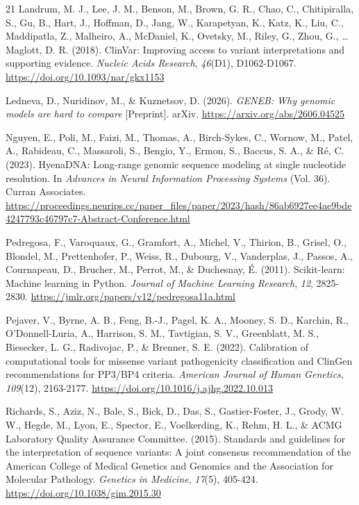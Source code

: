 \begin{thebibliography}{21}
Landrum, M. J., Lee, J. M., Benson, M., Brown, G. R., Chao, C., Chitipiralla, S., Gu, B., Hart, J., Hoffman, D., Jang, W., Karapetyan, K., Katz, K., Liu, C., Maddipatla, Z., Malheiro, A., McDaniel, K., Ovetsky, M., Riley, G., Zhou, G., \ldots{} Maglott, D. R. (2018). ClinVar: Improving access to variant interpretations and supporting evidence. \textit{Nucleic Acids Research}, \textit{46}(D1), D1062-D1067. \url{https://doi.org/10.1093/nar/gkx1153}

Ledneva, D., Nuridinov, M., \& Kuznetsov, D. (2026). \textit{GENEB: Why genomic models are hard to compare} [Preprint]. arXiv. \url{https://arxiv.org/abs/2606.04525}

Nguyen, E., Poli, M., Faizi, M., Thomas, A., Birch-Sykes, C., Wornow, M., Patel, A., Rabideau, C., Massaroli, S., Bengio, Y., Ermon, S., Baccus, S. A., \& R{\'e}, C. (2023). HyenaDNA: Long-range genomic sequence modeling at single nucleotide resolution. In \textit{Advances in Neural Information Processing Systems} (Vol. 36). Curran Associates. \url{https://proceedings.neurips.cc/paper_files/paper/2023/hash/86ab6927ee4ae9bde4247793c46797c7-Abstract-Conference.html}

Pedregosa, F., Varoquaux, G., Gramfort, A., Michel, V., Thirion, B., Grisel, O., Blondel, M., Prettenhofer, P., Weiss, R., Dubourg, V., Vanderplas, J., Passos, A., Cournapeau, D., Brucher, M., Perrot, M., \& Duchesnay, {\'E}. (2011). Scikit-learn: Machine learning in Python. \textit{Journal of Machine Learning Research}, \textit{12}, 2825-2830. \url{https://jmlr.org/papers/v12/pedregosa11a.html}

Pejaver, V., Byrne, A. B., Feng, B.-J., Pagel, K. A., Mooney, S. D., Karchin, R., O'Donnell-Luria, A., Harrison, S. M., Tavtigian, S. V., Greenblatt, M. S., Biesecker, L. G., Radivojac, P., \& Brenner, S. E. (2022). Calibration of computational tools for missense variant pathogenicity classification and ClinGen recommendations for PP3/BP4 criteria. \textit{American Journal of Human Genetics}, \textit{109}(12), 2163-2177. \url{https://doi.org/10.1016/j.ajhg.2022.10.013}

Richards, S., Aziz, N., Bale, S., Bick, D., Das, S., Gastier-Foster, J., Grody, W. W., Hegde, M., Lyon, E., Spector, E., Voelkerding, K., Rehm, H. L., \& ACMG Laboratory Quality Assurance Committee. (2015). Standards and guidelines for the interpretation of sequence variants: A joint consensus recommendation of the American College of Medical Genetics and Genomics and the Association for Molecular Pathology. \textit{Genetics in Medicine}, \textit{17}(5), 405-424. \url{https://doi.org/10.1038/gim.2015.30}


\end{thebibliography}

